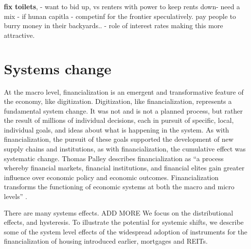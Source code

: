 \textbf{fix toilets}, - want to bid up, vs renters with power to keep rents down- need a mix - if hunan capitla - competinf for the frontier speculatively. pay people to burry money in their backyards.. - role of interest rates making this more attractive. 

\section{Systems change}
At the macro level, %
financialization is an emergent and transformative feature of the economy, like digitization. Digitization, like financialization, represents a fundamental  system  change. It was not and is not a planned process, but rather the result of millions of individual decisions, each in pursuit of specific, local, individual goals, and ideas about what is happening in the system.  As with financialization, the pursuit of these goals supported the development of new supply chains and institutions, as with  financialization, the cumulative effect was systematic change. 
Thomas Palley describes financialization as ``a process whereby financial markets, financial institutions, and financial elites gain greater influence over economic policy and economic outcomes. Financialization transforms the functioning of economic systems at both the macro and micro levels'' \cite{palleyFinancializationWhatIt2007}. 

There are many systems effects. ADD MORE %
We focus on the distributional effects, and hysteresis.
To illustrate the potential for systemic shifts, we describe some of the system level effects of the widespread adoption of instruments for the financialization of housing introduced earlier, mortgages and REITs. 

